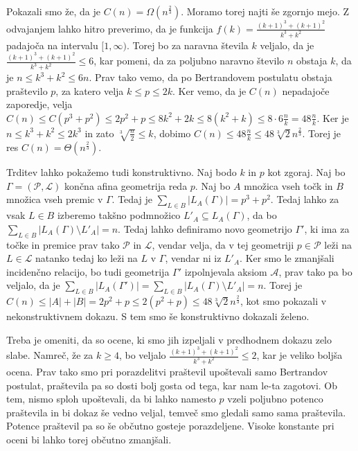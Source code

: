 \documentclass[mat1, tisk]{fmfdelo}
\begin{document}
    \begin{dokaz}
        Pokazali smo že, da je $C(n) = \Omega(n^{\frac{2}{3}})$. Moramo torej najti še zgornjo mejo. Z odvajanjem lahko hitro preverimo, da je funkcija $f(k) = \frac{(k+1)^3 + (k+1)^2}{k^3+k^2}$ padajoča na intervalu $[1,\infty)$. Torej bo za naravna števila $k$ veljalo,
        da je $\frac{(k+1)^3 + (k+1)^2}{k^3+k^2} \leq 6$, kar pomeni, da za poljubno naravno število $n$ obstaja $k$, da je $n \leq k^3 + k^2 \leq 6n$. Prav tako vemo, da po Bertrandovem postulatu obstaja praštevilo $p$, za katero velja $k \leq p \leq 2k$. Ker vemo, da je
        $C(n)$ nepadajoče zaporedje, velja $C(n) \leq C(p^3 + p^2) \leq 2p^2 + p \leq 8k^2 + 2k \leq 8(k^2 + k) \leq 8\cdot 6\frac{n}{k} = 48\frac{n}{k}$. Ker je $n \leq k^3 + k^2 \leq 2k^3$ in zato $\sqrt[3]{\frac{n}{2}} \leq k$, dobimo $C(n) \leq 48\frac{n}{k} \leq 48\sqrt[3]{2}n^{\frac{2}{3}}$.
        Torej je res $C(n) = \Theta(n^{\frac{2}{3}})$.

        Trditev lahko pokažemo tudi konstruktivno. Naj bodo $k$ in $p$ kot zgoraj. Naj bo $\Gamma = (\mathcal{P}, \mathcal{L})$ končna afina geometrija reda $p$. Naj bo $A$ množica vseh točk in $B$ množica vseh premic v $\Gamma$. Tedaj je $\sum_{L \in B}|L_A(\Gamma)| = p^3 + p^2$. Tedaj lahko za vsak $L \in B$ izberemo takšno podmnožico 
        $L'_A \subseteq L_A(\Gamma)$, da bo $\sum_{L \in B}|L_A(\Gamma)\setminus L'_A| = n$. Tedaj lahko definiramo novo geometrijo $\Gamma'$, ki ima za točke in premice prav tako $\mathcal{P}$ in $\mathcal{L}$, vendar velja, da v tej geometriji $p \in \mathcal{P}$ leži na $L \in \mathcal{L}$ natanko tedaj ko leži na $L$ v $\Gamma$, 
        vendar ni iz $L'_A$. Ker smo le zmanjšali incidenčno relacijo, bo tudi geometrija $\Gamma'$ izpolnjevala aksiom $\mathcal{A}$, prav tako pa bo veljalo, da je $\sum_{L \in B}|L_A(\Gamma')| = \sum_{L \in B}|L_A(\Gamma)\setminus L'_A| = n$. Torej je $C(n) \leq |A| + |B| = 2p^2 + p \leq 2(p^2 + p) \leq 48\sqrt[3]{2}n^{\frac{2}{3}}$,
        kot smo pokazali v nekonstruktivnem dokazu. S tem smo še konstruktivno dokazali želeno.
    \end{dokaz}

Treba je omeniti, da so ocene, ki smo jih izpeljali v predhodnem dokazu zelo slabe. Namreč, že za $k \geq 4$, bo veljalo $\frac{(k+1)^3 + (k+1)^2}{k^3+k^2} \leq 2$, kar je veliko boljša ocena. Prav tako smo pri porazdelitvi praštevil upoštevali samo Bertrandov postulat,
praštevila pa so dosti bolj gosta od tega, kar nam le-ta zagotovi. Ob tem, nismo sploh upoštevali, da bi lahko namesto $p$ vzeli poljubno potenco praštevila in bi dokaz še vedno veljal, temveč smo gledali samo sama praštevila. Potence praštevil pa so še občutno
gosteje porazdeljene. Visoke konstante pri oceni bi lahko torej občutno zmanjšali.
\end{document}

